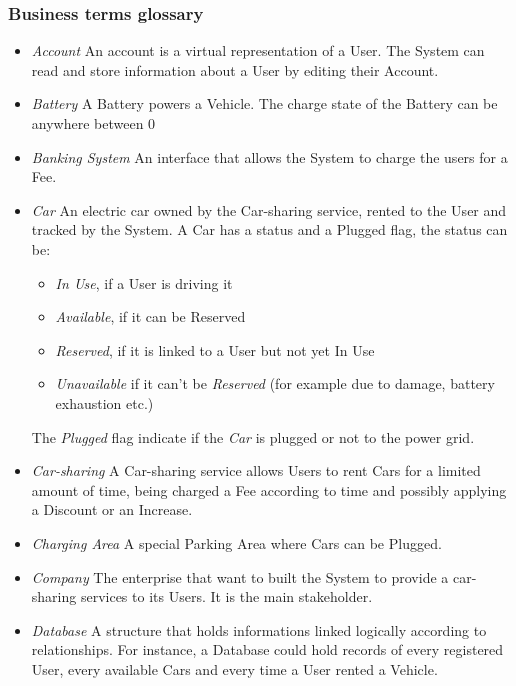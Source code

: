 \subsubsection{Business terms glossary}
\begin{itemize}
	\item \emph{Account}
	An account is a virtual representation of a User. The System can read and store information about a User by editing their Account.
	
	\item \emph{Battery}
	A Battery powers a Vehicle. The charge state of the Battery can be anywhere between 0%
	
	\item \emph{Banking System}
	An interface that allows the System to charge the users for a Fee.
	
	\item \emph{Car}
	An electric car owned by the Car-sharing service, rented to the User and tracked by the System. A Car has a status and a Plugged flag, the status can be:
	\begin{itemize}
		\item \textit{In Use}, if a User is driving it
		\item \textit{Available}, if it can be Reserved
		\item \textit{Reserved}, if it is linked to a User but not yet In Use
		\item \textit{Unavailable} if it can't be \textit{Reserved} (for example due to damage, battery exhaustion etc.)
	\end{itemize}
	The \textit{Plugged} flag indicate if the \emph{Car} is plugged or not to the power grid.
	
	\item \emph{Car-sharing}
	A Car-sharing service allows Users to rent Cars for a limited amount of time, being charged a Fee according to time and possibly applying a Discount or an Increase.

	\item \emph{Charging Area}
	A special Parking Area where Cars can be Plugged.

	\item \emph{Company}
	The enterprise that want to built the System to provide a car-sharing services to its Users. It is the main stakeholder.

	\item \emph{Database}
	A structure that holds informations linked logically according to relationships. For instance, a Database could hold records of every registered User, every available Cars and every time a User rented a Vehicle.


\end{itemize}
